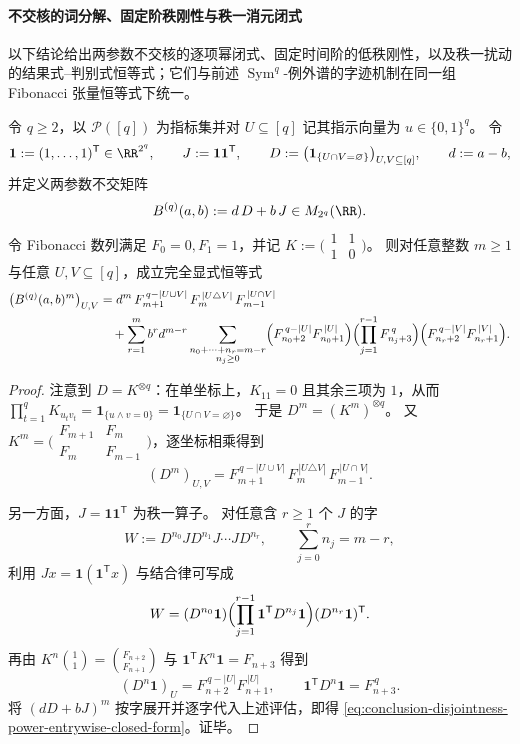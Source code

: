 \paragraph{不交核的词分解、固定阶秩刚性与秩一消元闭式}
以下结论给出两参数不交核的逐项幂闭式、固定时间阶的低秩刚性，以及秩一扰动的结果式--判别式恒等式；它们与前述 \(\operatorname{Sym}^q\)-例外谱的字迹机制在同一组 Fibonacci 张量恒等式下统一。

\begin{theorem}[两参数不交核的逐项幂闭式与词分解]\label{thm:conclusion-disjointness-power-word-decomposition}
令 \(q\ge 2\)，以 \(\mathcal P([q])\) 为指标集并对 \(U\subseteq[q]\) 记其指示向量为 \(u\in\{0,1\}^q\)。
令
\[
\mathbf 1:= (1,\dots,1)^{\mathsf T}\in\RR^{2^q},\qquad
J:=\mathbf 1\mathbf 1^{\mathsf T},\qquad
D:=\bigl(\mathbf 1_{\{U\cap V=\varnothing\}}\bigr)_{U,V\subseteq[q]},
\qquad
d:=a-b,
\]
并定义两参数不交矩阵
\[
B^{(q)}(a,b):=d\,D+b\,J\in M_{2^q}(\RR).
\]
令 Fibonacci 数列满足 \(F_0=0,F_1=1\)，并记
\(
K:=\bigl(\begin{smallmatrix}1&1\\[2pt]1&0\end{smallmatrix}\bigr)
\)。
则对任意整数 \(m\ge 1\) 与任意 \(U,V\subseteq[q]\)，成立完全显式恒等式
\begin{align}\label{eq:conclusion-disjointness-power-entrywise-closed-form}
\bigl(B^{(q)}(a,b)^m\bigr)_{U,V}
&=
d^{m}\,F_{m+1}^{\,q-|U\cup V|}\,F_{m}^{\,|U\triangle V|}\,F_{m-1}^{\,|U\cap V|}
\nonumber\\
&\quad+\sum_{r=1}^{m} b^{r}d^{m-r}
\sum_{\substack{n_0+\cdots+n_r=m-r\\ n_j\ge 0}}
\Bigl(F_{n_0+2}^{\,q-|U|}F_{n_0+1}^{\,|U|}\Bigr)
\Bigl(\prod_{j=1}^{r-1}F_{n_j+3}^{\,q}\Bigr)
\Bigl(F_{n_r+2}^{\,q-|V|}F_{n_r+1}^{\,|V|}\Bigr).
\end{align}
\end{theorem}
\begin{proof}
注意到 \(D=K^{\otimes q}\)：在单坐标上，\(K_{11}=0\) 且其余三项为 \(1\)，从而
\(
\prod_{t=1}^{q}K_{u_t v_t}=\mathbf 1_{\{u\wedge v=0\}}=\mathbf 1_{\{U\cap V=\varnothing\}}
\)。
于是 \(D^m=(K^m)^{\otimes q}\)。
又 \(K^m=\bigl(\begin{smallmatrix}F_{m+1}&F_m\\[2pt]F_m&F_{m-1}\end{smallmatrix}\bigr)\)，逐坐标相乘得到
\[
(D^m)_{U,V}=F_{m+1}^{\,q-|U\cup V|}\,F_{m}^{\,|U\triangle V|}\,F_{m-1}^{\,|U\cap V|}.
\]
\par
另一方面，\(J=\mathbf 1\mathbf 1^{\mathsf T}\) 为秩一算子。
对任意含 \(r\ge 1\) 个 \(J\) 的字
\[
W:=D^{n_0}J D^{n_1}J\cdots J D^{n_r},\qquad \sum_{j=0}^{r}n_j=m-r,
\]
利用 \(Jx=\mathbf 1(\mathbf 1^{\mathsf T}x)\) 与结合律可写成
\[
W=(D^{n_0}\mathbf 1)\Bigl(\prod_{j=1}^{r-1}\mathbf 1^{\mathsf T}D^{n_j}\mathbf 1\Bigr)(D^{n_r}\mathbf 1)^{\mathsf T}.
\]
再由
\(
K^n\binom11=\binom{F_{n+2}}{F_{n+1}}
\)
与
\(
\mathbf 1^{\mathsf T}K^n\mathbf 1=F_{n+3}
\)
得到
\[
(D^{n}\mathbf 1)_{U}=F_{n+2}^{\,q-|U|}F_{n+1}^{\,|U|},
\qquad
\mathbf 1^{\mathsf T}D^{n}\mathbf 1=F_{n+3}^{\,q}.
\]
将 \((dD+bJ)^m\) 按字展开并逐字代入上述评估，即得 \eqref{eq:conclusion-disjointness-power-entrywise-closed-form}。证毕。
\end{proof}

